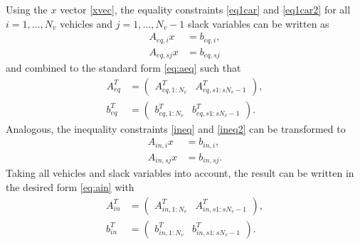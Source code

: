 \documentclass[letterpaper,10pt,conference]{ieeeconf}
\begin{document}
Using the $x$ vector \eqref{xvec}, the equality constraints \eqref{eq1car} and \eqref{eq1car2} for all $i=1,\dots, N_v$ vehicles and $j=1,\dots, N_v-1$ slack variables can be written as 
\begin{align}
    A_{eq,i}x&=b_{eq,i}, \\
    A_{eq,sj}x&=b_{eq,sj}
\end{align}
and combined to the standard form \eqref{eq:aeq} such that
\begin{align}
A_{eq}^T&=
\begin{pmatrix}
    A_{eq,1:N_v}^T & A_{eq,s1:sN_v-1}^T
    \end{pmatrix},\\
    b_{eq}^T&=\begin{pmatrix}
    b_{eq,1:N_v}^T & b_{eq,s1:sN_v-1}^T
    \end{pmatrix}.
\end{align}
Analogous, the inequality constraints \eqref{ineq} and \eqref{ineq2} can be transformed to
\begin{align}
    A_{in,i}x&=b_{in,i}, \\
    A_{in,sj}x&=b_{in,sj}.
\end{align}
Taking all vehicles and slack variables into account, the result can be written in the desired form \eqref{eq:ain} with
\begin{align}
A_{in}^T&=
\begin{pmatrix}
    A_{in,1:N_v}^T & A_{in,s1:sN_v-1}^T
    \end{pmatrix},\\
    b_{in}^T&=\begin{pmatrix}
    b_{in,1:N_v}^T & b_{in,s1:sN_v-1}^T
    \end{pmatrix}.
\end{align}
\end{document}
